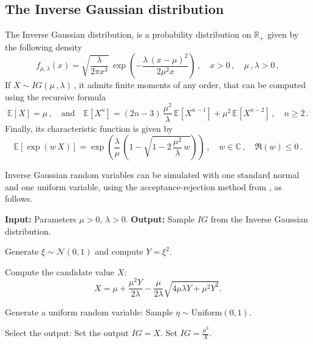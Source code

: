 \documentclass{article}
\newcommand{\R}{\mathbb{R}}
\newcommand{\1}{\mathbbm{1}}
\numberwithin{equation}{section}
\begin{document}
\begin{appendix}
    \section{The Inverse Gaussian distribution}
    \label{App:IG}
    The Inverse Gaussian distribution, is a probability distribution on $\R_+$ given by the following density
    \begin{equation}
        \label{eq:IG_density}
        f_{\mu,\lambda}(x) = \sqrt{\frac{\lambda}{2\pi x^3}}\,\exp\left(- \frac{\lambda\,(x - \mu)^2}{2\mu^2 x} \right)\,,\quad x > 0\,, \quad \mu\,,\lambda > 0\,,
    \end{equation}
    If $X \sim IG(\mu\,,\lambda)\,$, it admits finite moments of any order, that can be computed using the recursive formula
    \begin{equation}
        \label{eq:IG_moments}
        \mathbb E \left[X\right] = \mu\,, \quad \text{and}\quad \mathbb E \left[X^{n}\right] = (2n - 3)\,\frac{\mu^2}{\lambda}\,\mathbb E \left[X^{n-1}\right] + \mu^2\,\mathbb E \left[X^{n-2}\right]\,, \quad n \geq 2 \,. 
    \end{equation}
    Finally, its characteristic function is given by 
    \begin{equation}
        \label{eq:IG_charac}
        \mathbb E \left[\exp\left( w\,X\right) \right] = \exp \left(\frac{\lambda}{\mu}\,\left(1 - \sqrt{1 - 2\,\frac{\mu^2}{\lambda}\,w} \right) \right)\,, \quad w \in \mathbb C\,, \quad \Re(w) \leq 0\,.
    \end{equation}

    Inverse Gaussian random variables can be simulated with one standard normal and one uniform variable, using the acceptance-rejection method from \citet*{michael1976generating}, as follows.
    
    \begin{algorithm}[H]
\caption{Sampling from the Inverse Gaussian Distribution}\label{alg:IG_sampling}
\begin{algorithmic}[1]
\State \textbf{Input:} Parameters \( \mu > 0 \), \( \lambda > 0 \).
\State \textbf{Output:} Sample \( IG \) from the Inverse Gaussian distribution.

\State   
Generate \( \xi \sim \mathcal{N}(0, 1) \) and compute \( Y = \xi^2 \).

\State Compute the candidate value \( X \):  
$$
X = \mu + \frac{\mu^2 Y}{2\lambda} - \frac{\mu}{2\lambda} \sqrt{4\mu\lambda Y + \mu^2 Y^2}.
$$

\State Generate a uniform random variable:  
Sample \( \eta \sim \text{Uniform}(0, 1) \).

\State Select the output:  
    \State Set the output \( IG = X \).
\Else
    \State Set \( IG = \frac{\mu^2}{X} \).
\EndIf
\end{algorithmic}
\end{algorithm}
\end{appendix}



\end{document}
